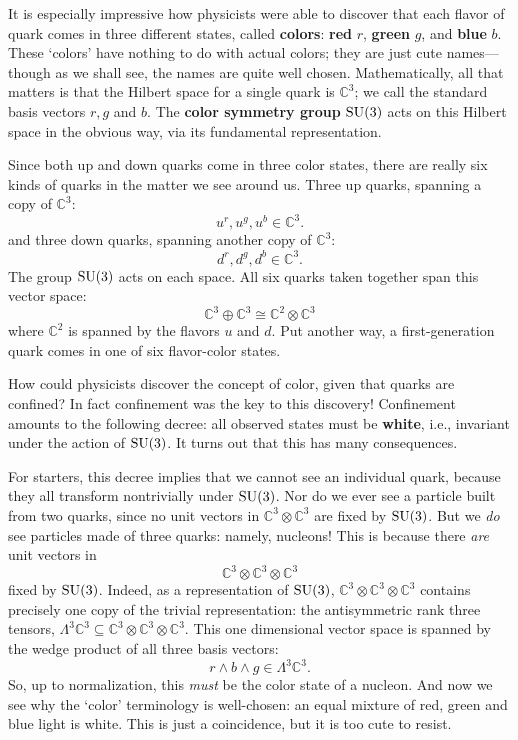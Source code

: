 \documentclass{article}
\newcommand{\C}{{\mathbb C}}  %
\newcommand{\SU}{{\rm SU}}    %
\newcommand{\Ex}{\Lambda} %
\newcommand{\iso}{\cong} %
\begin{document}
It is especially impressive how physicists were able to discover
that each flavor of quark comes in three different states,
called \textbf{colors}: \textbf{red} $r$, \textbf{green} $g$, 
and \textbf{blue} $b$.  These `colors' have nothing to do with 
actual colors; they are just cute names---though as we shall see, 
the names are quite well chosen.  Mathematically, all that matters is
that the Hilbert space for a single quark is $\C^3$; we call the 
standard basis vectors $r, g$ and $b$.  The \textbf{color symmetry 
group} $\SU(3)$ acts on this Hilbert space in the obvious way, via 
its fundamental representation.

Since both up and down quarks come in three color states, there are 
really six kinds of quarks in the matter we see around us. 
Three up quarks, spanning a copy of $\C^3$:
\[ u^r, u^g, u^b \in \C^3 .\]
and three down quarks, spanning another copy of $\C^3$:
\[ d^r, d^g, d^b \in \C^3 .\]
The group $\SU(3)$ acts on each space.  
All six quarks taken together span this vector space:
\[ \C^3 \oplus \C^3 \iso \C^2 \otimes \C^3 \]
where $\C^2$ is spanned by the flavors $u$ and $d$.  Put another way,  a
first-generation quark comes in one of six flavor-color states.

How could physicists discover the concept of color, given that quarks
are confined?  In fact confinement was the key to this discovery!
Confinement amounts to the following decree: all observed
states must be {\bf white}, i.e., invariant under the action of
$\SU(3)$.  It turns out that this has many consequences.

For starters, this decree implies that we cannot see an individual
quark, because they all transform nontrivially under $\SU(3)$.  
Nor do we ever see a particle built from two quarks, since 
no unit vectors in $\C^3 \otimes \C^3$ are fixed by $\SU(3)$.  But 
we \emph{do} see particles made of three quarks: namely, nucleons!
This is because there \emph{are} unit vectors in 
\[ \C^3 \otimes \C^3 \otimes \C^3 \]
fixed by $\SU(3)$.  Indeed, as a representation of $\SU(3)$,
$\C^3 \otimes \C^3 \otimes \C^3$ contains precisely one copy of the trivial
representation: the antisymmetric rank three tensors, $\Ex^3 \C^3 \subseteq
\C^3 \otimes \C^3 \otimes \C^3$. This one dimensional vector space is spanned
by the wedge product of all three basis vectors:
\[ r \wedge b \wedge g \in \Ex^3 \C^3. \]
So, up to normalization, this \emph{must} be the color state of a nucleon. 
And now we see why the `color' terminology is well-chosen: an equal 
mixture of red, green and blue light is white.  This is just
a coincidence, but it is too cute to resist.
\end{document}
